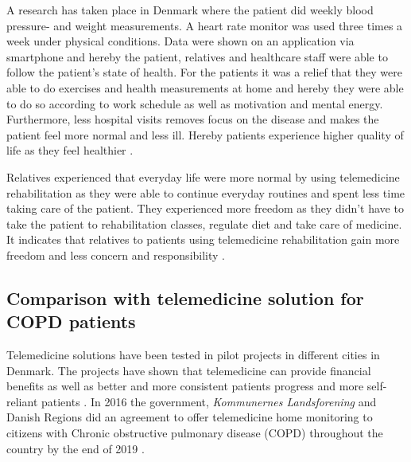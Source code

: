 A research has taken place in Denmark where the patient did weekly blood pressure- and weight measurements. A heart rate monitor was used three times a week under physical conditions. Data were shown on an application via smartphone and hereby the patient, relatives and healthcare staff were able to follow the patient’s state of health. For the patients it was a relief that they were able to do exercises and health measurements at home and hereby they were able to do so according to work schedule as well as motivation and mental energy. Furthermore, less hospital visits removes focus on the disease and makes the patient feel more normal and less ill. Hereby patients experience higher quality of life as they feel healthier \cite{Bregendahl_2016}.  

Relatives experienced that everyday life were more normal by using telemedicine rehabilitation as they were able to continue everyday routines and spent less time taking care of the patient. They experienced more freedom as they didn’t have to take the patient to rehabilitation classes, regulate diet and take care of medicine. It indicates that relatives to patients using telemedicine rehabilitation gain more freedom and less concern and responsibility \cite{7}.  

   
\subsection{Comparison with telemedicine solution for COPD patients}

Telemedicine solutions have been tested in pilot projects in different cities in Denmark. The projects have shown that telemedicine can provide financial benefits as well as better and more consistent patients progress and more self-reliant patients \cite{KOL_1}. In 2016 the government, \textit{Kommunernes Landsforening} and Danish Regions did an agreement to offer telemedicine home monitoring to citizens with Chronic obstructive pulmonary disease (COPD) throughout the country by the end of 2019 \cite{KOL_2}. 

